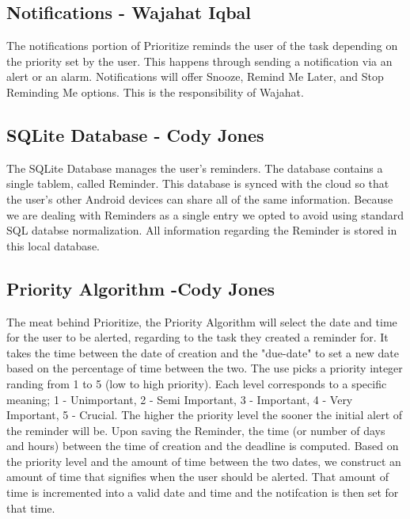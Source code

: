 \documentclass[12pt]{article}
\begin{document}
\subsection{Notifications - Wajahat Iqbal}
The notifications portion of Prioritize reminds the user of the task depending on the priority set by the user. This happens through sending a notification via an alert or an alarm.  Notifications will offer Snooze, Remind Me Later, and Stop Reminding Me options. This is the responsibility of Wajahat.

\subsection{SQLite Database - Cody Jones}
The SQLite Database manages the user's reminders. The database contains a single tablem, called Reminder. This database is synced with the cloud so that the user's other Android devices can share all of the same information. Because we are dealing with Reminders as a single entry we opted to avoid using standard SQL databse normalization. All information regarding the Reminder is stored in this local database. 


\subsection{Priority Algorithm -Cody Jones}
The meat behind Prioritize, the Priority Algorithm will select the date and time for the user to be alerted, regarding to the task they created a reminder for. It takes the time between the date of creation and the "due-date" to set a new date based on the percentage of time between the two. The use picks a priority integer randing from 1 to 5 (low to high priority). Each level corresponds to a specific meaning; 1 - Unimportant, 2 - Semi Important, 3 - Important, 4 - Very Important, 5 - Crucial. The higher the priority level the sooner the initial alert of the reminder will be. Upon saving the Reminder, the time (or number of days and hours) between the time of creation and the deadline is computed. Based on the priority level and the amount of time between the two dates, we construct an amount of time that signifies when the user should be alerted. That amount of time is incremented into a valid date and time and the notifcation is then set for that time. 
\end{document}

